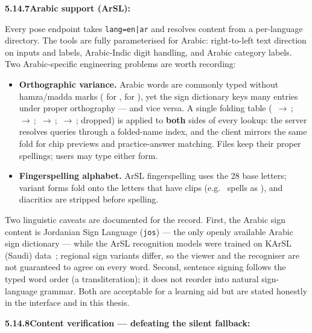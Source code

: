 \noindent\textbf{5.14.7\quad Arabic support (ArSL):}\par
{}
\vspace{0.2cm}

\noindent Every pose endpoint takes \texttt{lang=en|ar} and resolves content from a per-language directory. The tools are fully parameterised for Arabic: right-to-left text direction on inputs and labels, Arabic-Indic digit handling, and Arabic category labels. Two Arabic-specific engineering problems are worth recording:
\begin{itemize}
\item \textbf{Orthographic variance.} Arabic words are commonly typed without hamza/madda marks ( for ,  for ), yet the sign dictionary keys many entries under proper orthography --- and vice versa. A single folding table (\,\,\,$\rightarrow$\,; \,\,$\rightarrow$\,; \,$\rightarrow$\,; \,$\rightarrow$\,;  dropped) is applied to \textbf{both} sides of every lookup: the server resolves queries through a folded-name index, and the client mirrors the same fold for chip previews and practice-answer matching. Files keep their proper spellings; users may type either form.
\item \textbf{Fingerspelling alphabet.} ArSL fingerspelling uses the 28 base letters; variant forms fold onto the letters that have clips (e.g.\  spells as ), and diacritics are stripped before spelling.
\end{itemize}
\vspace{0.1cm}

\noindent Two linguistic caveats are documented for the record. First, the Arabic sign content is Jordanian Sign Language (\texttt{jos}) --- the only openly available Arabic sign dictionary --- while the ArSL recognition models were trained on KArSL (Saudi) data~\cite{sidig2021karsl}; regional sign variants differ, so the viewer and the recogniser are not guaranteed to agree on every word. Second, sentence signing follows the typed word order (a transliteration); it does not reorder into natural sign-language grammar. Both are acceptable for a learning aid but are stated honestly in the interface and in this thesis.\par\vspace{0.3cm}

\noindent\textbf{5.14.8\quad Content verification --- defeating the silent fallback:}\par
{}
\vspace{0.2cm}

